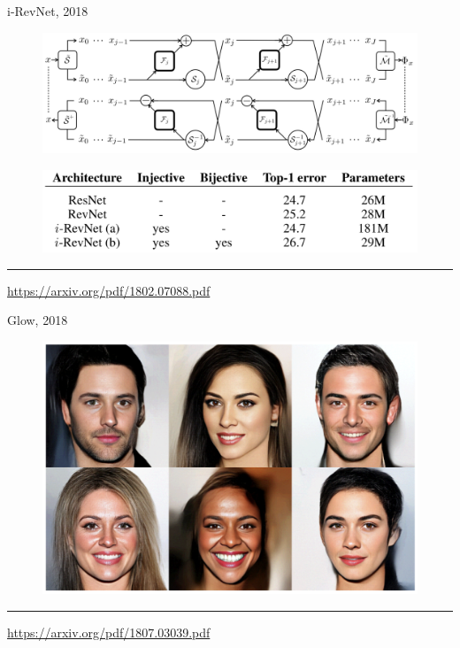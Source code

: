 \documentclass{beamer}
\begin{document}
\begin{frame}{i-RevNet, 2018}
	
	\begin{figure}
		\centering
		\includegraphics[width=\linewidth]{figs/i-revnet.png}
	\end{figure}
	
	\begin{figure}
		\centering
		\includegraphics[width=0.9\linewidth]{figs/i-revnet_block.png}
	\end{figure}
	
	\vfill
	\hrule\medskip
	{\scriptsize \href{https://arxiv.org/pdf/1802.07088.pdf}{https://arxiv.org/pdf/1802.07088.pdf}} 
\end{frame}
\begin{frame}{Glow, 2018}
	\begin{figure}
		\centering
		\includegraphics[width=\linewidth]{figs/glow_faces.png}
	\end{figure}
	\vfill
	\hrule\medskip
	{\scriptsize \href{https://arxiv.org/pdf/1807.03039.pdf}{https://arxiv.org/pdf/1807.03039.pdf}} 
\end{frame}
\end{document}
